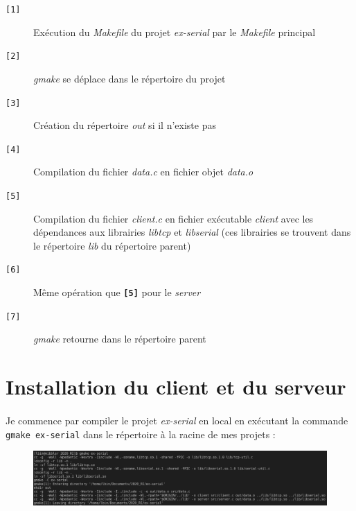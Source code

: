 \documentclass{article}
\begin{document}
    \begin{description}
        \item[\texttt{[1]} ] Exécution du \emph{Makefile} du projet \emph{ex-serial} par le \emph{Makefile} principal
        \item[\texttt{[2]} ] \emph{gmake} se déplace dans le répertoire du projet
        \item[\texttt{[3]} ] Création du répertoire \emph{out} si il n'existe pas
        \item[\texttt{[4]} ] Compilation du fichier \emph{data.c} en fichier objet \emph{data.o}
        \item[\texttt{[5]} ] Compilation du fichier \emph{client.c} en fichier exécutable \emph{client} avec les dépendances aux librairies \emph{libtcp} et \emph{libserial} (ces librairies se trouvent dans le répertoire \emph{lib} du répertoire parent)
        \item[\texttt{[6]} ] Même opération que \textbf{\texttt{[5]}} pour le \emph{server}
        \item[\texttt{[7]} ] \emph{gmake} retourne dans le répertoire parent
    \end{description}

    
    \section{Installation du client et du serveur}
    \paragraph{}
    Je commence par compiler le projet \emph{ex-serial} en local en exécutant la commande \texttt{gmake ex-serial} dans le répertoire à la racine de mes projets :
    \begin{figure}[H]
        \centering
        \includegraphics[width=\linewidth]{./screenshots/compilation.png}
    \end{figure}

    \newpage
\end{document}

